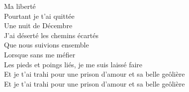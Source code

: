 \documentclass{novel}
\begin{document}
{\begin{minipage}[t][0.5\textheight][t]{\textwidth}
\begin{multicols}{2}
Ma liberté \\
Pourtant je t'ai quittée \\
Une nuit de Décembre \\
J'ai déserté les chemins écartés \\
Que nous suivions ensemble \\
Lorsque sans me méfier \\
Les pieds et poings liés, je me suis laissé faire \\
Et je t'ai trahi pour une prison d'amour et sa belle geôlière \\
Et je t'ai trahi pour une prison d'amour et sa belle geôlière
\end{multicols}
\end{minipage}
}

\newpage
\footnotesize
\end{document}
